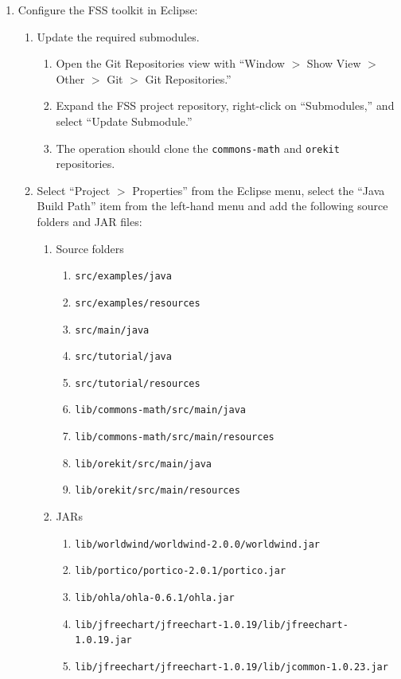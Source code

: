 \documentclass[]{article}
\begin{document}
\begin{enumerate}
\item Configure the FSS toolkit in Eclipse:
\begin{enumerate}
\item Update the required submodules.
\begin{enumerate}
\item Open the Git Repositories view with ``Window $>$ Show View $>$ Other $>$ Git $>$ Git Repositories.''
\item Expand the FSS project repository, right-click on ``Submodules,'' and select ``Update Submodule.''
\item The operation should clone the \texttt{commons-math} and \texttt{orekit} repositories.
\end{enumerate}
\item Select ``Project $>$ Properties'' from the Eclipse menu, select the ``Java Build Path'' item from the left-hand menu and add the following source folders and JAR files:
\begin{enumerate}
\item Source folders
\begin{enumerate} 
\item \texttt{src/examples/java}
\item \texttt{src/examples/resources}
\item \texttt{src/main/java}
\item \texttt{src/tutorial/java}
\item \texttt{src/tutorial/resources}
\item \texttt{lib/commons-math/src/main/java}
\item \texttt{lib/commons-math/src/main/resources}
\item \texttt{lib/orekit/src/main/java}
\item \texttt{lib/orekit/src/main/resources}
\end{enumerate}
\item JARs
\begin{enumerate} 
\item \texttt{lib/worldwind/worldwind-2.0.0/worldwind.jar}
\item \texttt{lib/portico/portico-2.0.1/portico.jar}
\item \texttt{lib/ohla/ohla-0.6.1/ohla.jar}
\item \texttt{lib/jfreechart/jfreechart-1.0.19/lib/jfreechart-1.0.19.jar}
\item \texttt{lib/jfreechart/jfreechart-1.0.19/lib/jcommon-1.0.23.jar}
\end{enumerate}
\end{enumerate}

\end{enumerate}
\end{enumerate}
\end{document}
